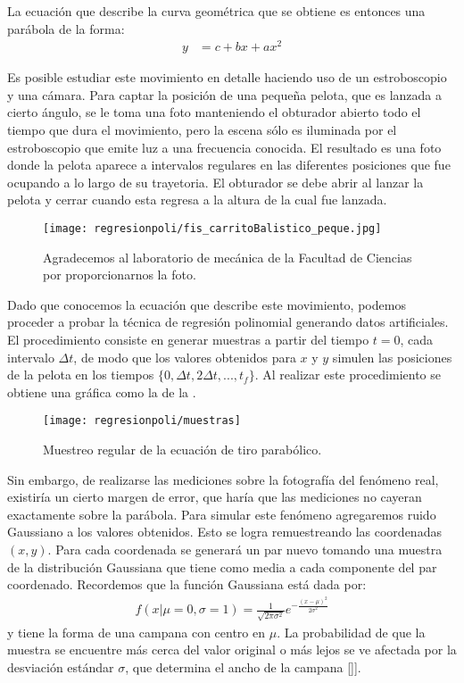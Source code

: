 La ecuación que describe la curva geométrica que se obtiene es entonces una parábola de la forma:
\begin{align*}
 y &= c + bx + ax^2
\end{align*}


Es posible estudiar este movimiento en detalle haciendo uso de un estroboscopio y una cámara.  Para captar la posición de una pequeña pelota, que es lanzada a cierto ángulo, se le toma una foto manteniendo el obturador abierto todo el tiempo que dura el movimiento, pero la escena sólo es iluminada por el estroboscopio que emite luz a una frecuencia conocida.  El resultado es una foto donde la pelota aparece a intervalos regulares en las diferentes posiciones que fue ocupando a lo largo de su trayetoria.  El obturador se debe abrir al lanzar la pelota y cerrar cuando esta regresa a la altura de la cual fue lanzada.  

\begin{figure}
 \centering
 \texttt{[image: regresionpoli/fis\_carritoBalistico\_peque.jpg]}
 \caption{Agradecemos al laboratorio de mecánica de la Facultad de Ciencias por proporcionarnos la foto.}\label{fig:tiropelota}
\end{figure}

Dado que conocemos la ecuación que describe este movimiento, podemos proceder a probar la técnica de regresión polinomial generando datos artificiales.  El procedimiento consiste en generar muestras a partir del tiempo $t=0$, cada intervalo $\Delta t$, de modo que los valores obtenidos para $x$ y $y$ simulen las posiciones de la pelota en los tiempos $\{0, \Delta t, 2 \Delta t, ..., t_f\}$.  Al realizar este procedimiento se obtiene una gráfica como la de la .

\begin{figure}
 \centering
 \texttt{[image: regresionpoli/muestras]}
 \caption{Muestreo regular de la ecuación de tiro parabólico.}\label{fig:muestras}
\end{figure}

Sin embargo, de realizarse las mediciones sobre la fotografía del fenómeno real, existiría un cierto margen de error, que haría que las mediciones no cayeran exactamente sobre la parábola.  Para simular este fenómeno agregaremos ruido Gaussiano a los valores obtenidos.  Esto se logra remuestreando las coordenadas $(x,y)$.  Para cada coordenada se generará un par nuevo tomando una muestra de la distribución Gaussiana que tiene como media a cada componente del par coordenado.  Recordemos que la función Gaussiana está dada por:
\begin{align*}
f(x|\mu=0, \sigma=1) = \frac{1}{\sqrt{2 \pi \sigma^2}} e^{-\frac{(x - \mu)^2}{2 \sigma^2}}
\end{align*}
y tiene la forma de una campana con centro en $\mu$.  La probabilidad de que la muestra se encuentre más cerca del valor original o más lejos se ve afectada por la desviación estándar $\sigma$, que determina el ancho de la campana []].

